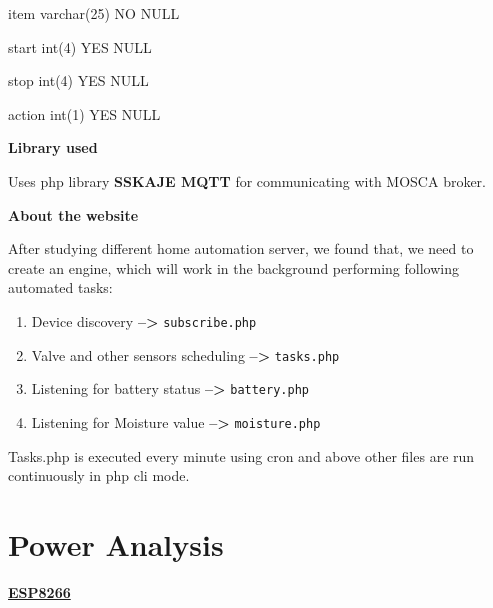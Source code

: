 \documentclass[16pt]{article}
\begin{document}
item \textbar{} varchar(25) \textbar{} NO \textbar{} \textbar{} NULL
\textbar{} \textbar{}

start \textbar{} int(4) \textbar{} YES \textbar{} \textbar{} NULL
\textbar{} \textbar{}

stop \textbar{} int(4) \textbar{} YES \textbar{} \textbar{} NULL
\textbar{} \textbar{}

action \textbar{} int(1) \textbar{} YES \textbar{} \textbar{} NULL
\textbar{}


\textbf{Library used}

Uses php library \textbf{SSKAJE MQTT} for communicating with MOSCA
broker.



\textbf{About the website}

After studying different home automation server, we found that, we need
to create an engine, which will work in the background performing
following automated tasks:

\begin{enumerate}

\item Device discovery \textbf{--\textgreater{}}
\texttt{subscribe.php}
\item Valve and other sensors scheduling
\textbf{--\textgreater{}} \texttt{tasks.php} 
\item Listening for battery status \textbf{--\textgreater{}} \texttt{battery.php} 
\item Listening for Moisture value \textbf{--\textgreater{}} \texttt{moisture.php}

\end{enumerate}


Tasks.php is executed every minute using cron and above other files are
run continuously in php cli mode.

\vspace{13cm}

\section{Power Analysis}
\vspace{0.5cm}

{\Large{\underline{\textbf{ESP8266}}}}
\end{document}
